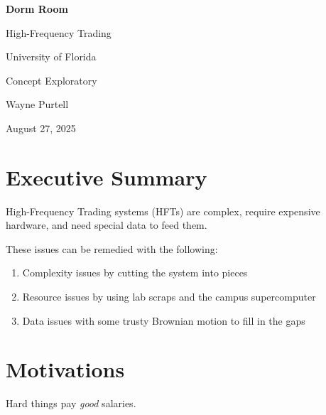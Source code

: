 \documentclass[12pt]{article}
\begin{document}
\begin{titlepage}
  \centering
  {\Huge\bfseries Dorm Room \par High-Frequency Trading \par} %
  \vspace{.5cm}
  {\Large University of Florida \par}
  \vspace{2cm}
  {\Large Concept Exploratory \par}
  \vspace{1.5cm}
  {\large Wayne Purtell \par}
  \vspace{2cm}
  {\large August 27, 2025\par}
\end{titlepage}

\tableofcontents

\clearpage

\section*{Executive Summary}
High-Frequency Trading systems (HFTs) are complex, require expensive hardware, and need special data to feed them. 

These issues can be remedied with the following:
\begin{enumerate}
  \item Complexity issues by cutting the system into pieces\,
  \item Resource issues by using lab scraps and the campus supercomputer\,
  \item Data issues with some trusty Brownian motion to fill in the gaps
\end{enumerate}

\clearpage


\section*{Motivations}
Hard things pay \emph{good} salaries.
\end{document}
